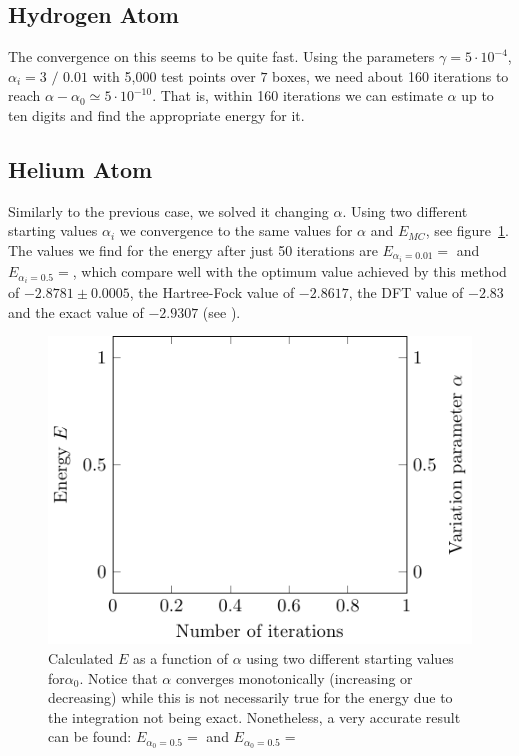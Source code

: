 \subsection{Hydrogen Atom}
 The convergence on this seems to be quite fast. Using the parameters $\gamma = 5\cdot 10^{-4}$, $\alpha_i = 3 \text{~/~}0.01$ with 5,000 test points over $7$ boxes, we need about 160 iterations to reach $\alpha-\alpha_0 \simeq 5 \cdot 10^{-10}$. That is, within 160 iterations we can estimate $\alpha$ up to ten digits and find the appropriate energy for it.


\subsection{Helium Atom}

Similarly to the previous case, we solved it changing $\alpha$. Using two different starting values $\alpha_i$ we convergence to the same values for $\alpha$ and $E_{MC}$, see figure~\ref{fig:He_it}. The values we find for the energy after just 50 iterations are $E_{\alpha_i = 0.01} =  $ and $E_{\alpha_i = 0.5} =  $, which compare well with the optimum value achieved by this method of $-2.8781 \pm 0.0005$, the Hartree-Fock value of $-2.8617$, the DFT value of $-2.83$ and the exact value of $-2.9307$ (see \cite{JosBook}). %

\begin{figure}
  \begin{center}
  \includegraphics[scale=1 ]{graphs/he-e-alpha-iterations.pdf}
  \caption{
  	Calculated $E$ as a function of $\alpha$ using two different starting values for$\alpha_0$. Notice that $\alpha$ converges monotonically (increasing or decreasing) while this is not necessarily true for the energy due to the integration not being exact. Nonetheless, a very accurate result can be found: $E_{\alpha_0 = 0.5} =  $ and $E_{\alpha_0 = 0.5} =  $
  	}
  \label{fig:He_it}
  \end{center}
\end{figure}
